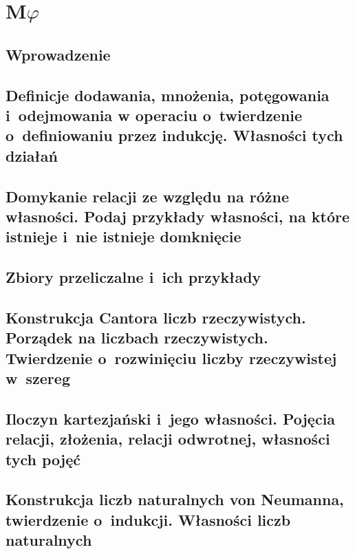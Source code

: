 \chapter{\texorpdfstring{M\(\varphi\)}{MFI}}


\section*{Wprowadzenie}


\section{Definicje dodawania, mnożenia, potęgowania i~odejmowania w operaciu o~twierdzenie o~definiowaniu przez indukcję. Własności tych działań}


\section{Domykanie relacji ze względu na różne własności. Podaj przykłady własności, na które istnieje i~nie istnieje domknięcie}


\section{Zbiory przeliczalne i~ich przykłady}
\label{mfi:countable}


\section{Konstrukcja Cantora liczb rzeczywistych. Porządek na liczbach rzeczywistych. Twierdzenie o~rozwinięciu liczby rzeczywistej w~szereg}


\section{Iloczyn kartezjański i~jego własności. Pojęcia relacji, złożenia, relacji odwrotnej, własności tych pojęć}
\label{mfi:cartesian_and_relations}


\section{Konstrukcja liczb naturalnych von Neumanna, twierdzenie o~indukcji. Własności liczb naturalnych}
\label{mfi:nat_and_induction}


